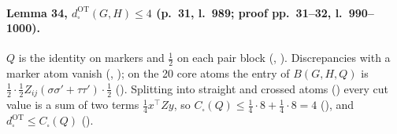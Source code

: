 \paragraph{Lemma 34, $d^{\mathrm{OT}}_\square(G,H)\le4$ (p.~31, l.~989; proof pp.~31--32, l.~990--1000).} $Q$ is the identity on markers and $\frac12$ on each pair block
(, ). Discrepancies with a marker atom vanish (, ); on the
20 core atoms the entry of $B(G,H,Q)$ is $\frac12\cdot\frac12Z_{ij}(\sigma\sigma'+\tau\tau')\cdot\frac12$ ().
Splitting into straight and crossed atoms () every cut value is a sum of two terms $\frac14x^\top Zy$, so
$C_\square(Q)\le\frac14\cdot8+\frac14\cdot8=4$ (), and $d^{\mathrm{OT}}_\square\le C_\square(Q)$ ().

